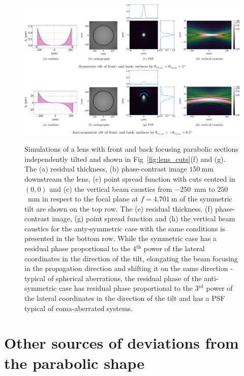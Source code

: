 \begin{refsection}
\begin{figure}[t]
        \centering
        {\includegraphics[width=1.\linewidth]{figures/ch04/tilt_fs_CRL.pdf}}
        \caption[Effects of the tilted parabolic section]{Simulations of a lens with front and back focusing parabolic sections independently tilted and shown in Fig~\ref{fig:lens_cuts}(f) and (g). The (a) residual thickness, (b) phase-contrast image $150~$mm downstream the lens, (c) point spread function with cuts centred in $(0,0)$ and (c) the vertical beam caustics from $-250$~mm to $250$~mm in respect to the focal plane at $f=4.701~$m of the symmetric tilt are shown on the top row. The (e) residual thickness, (f) phase-contrast image, (g) point spread function and (h) the vertical beam caustics for the anty-symmetric case with the same conditions is presented in the bottom row. While the symmetric case has a residual phase proportional to the 4$^{\text{th}}$ power of the lateral coordinates in the direction of the tilt, elongating the beam focusing in the propagation direction and shifting it on the same direction - typical of spherical aberrations, the residual phase of the anti-symmetric case has residual phase proportional to the 3$^{\text{rd}}$ power of the lateral coordinates in the direction of the tilt and has a PSF typical of coma-aberrated systems.  } \label{fig:tilt_fs_CRL}
\end{figure}

\section{Other sources of deviations from the parabolic shape}


\end{refsection}

